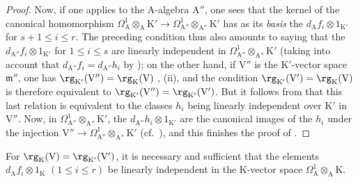 \begin{proof}
Now, if one applies  to the $\mathrm{A}$-algebra $\mathrm{A}''$, one sees that the kernel of the canonical homomorphism $\Omega^1_\mathrm{A}\otimes_\mathrm{A}\mathrm{K}'\to\Omega^1_{\mathrm{A}''}\otimes_{\mathrm{A}''}\mathrm{K}'$ has as its \emph{basis} the $d_\mathrm{A}f_i\otimes 1_{\mathrm{K}'}$ for $s+1\leq i\leq r$.
The preceding condition thus also amounts to saying that the $d_{\mathrm{A}''}f_i\otimes 1_{\mathrm{K}'}$ for $1\leq i\leq s$ are linearly independent in $\Omega^1_{\mathrm{A}''}\otimes_{\mathrm{A}''}\mathrm{K}'$ (taking into account that $d_{\mathrm{A}''}f_i=d_{\mathrm{A}''}h_i$ by );
on the other hand, if $\mathrm{V}''$ is the $\mathrm{K}'$-vector space $\mathfrak{m}''$, one has $\rg_{\mathrm{K}'}(\mathrm{V}'')=\rg_\mathrm{K}(\mathrm{V})$ , (ii), and the condition $\rg_{\mathrm{K}'}(\mathrm{V}')=\rg_\mathrm{K}(\mathrm{V})$ is therefore equivalent to $\rg_{\mathrm{K}'}(\mathrm{V}'')=\rg_{\mathrm{K}'}(\mathrm{V}')$.
But it follows from  that this last relation is equivalent to the classes $h_i$
being linearly independent over $\mathrm{K}'$ in $\mathrm{V}''$.
Now, in $\Omega^1_{\mathrm{A}''}\otimes_{\mathrm{A}''}\mathrm{K}'$, the $d_{\mathrm{A}''}h_i\otimes 1_{\mathrm{K}'}$ are the canonical images  of the $h_i$ under the injection $\mathrm{V}''\to\Omega^1_{\mathrm{A}''}\otimes_{\mathrm{A}''}\mathrm{K}'$ (cf.~), and this finishes the proof of .
\end{proof}

\begin{corollary}[22.4.7.4]
\label{0.22.4.7.4}
For $\rg_\mathrm{K}(\mathrm{V})=\rg_{\mathrm{K}'}(\mathrm{V}')$, it is necessary and sufficient that the elements $d_\mathrm{A}f_i\otimes 1_\mathrm{K}$ $(1\leq i\leq r)$ be linearly independent in the $\mathrm{K}$-vector space $\Omega^1_\mathrm{A}\otimes_\mathrm{A}\mathrm{K}$.
\end{corollary}

